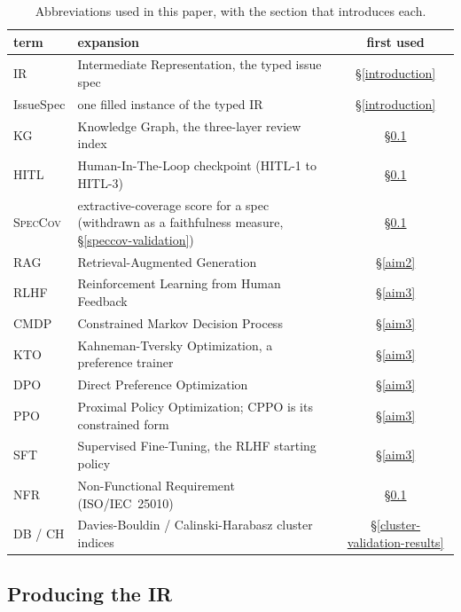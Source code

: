 \documentclass[sigconf, anonymous]{acmart}
\begin{document}
\begin{table}[t]\centering\footnotesize
\caption{Abbreviations used in this paper, with the section that introduces each.}\label{tab:acronyms}
\begin{tabular}{@{}llc@{}}\toprule
term & expansion & first used \\\midrule
IR & Intermediate Representation, the typed issue spec & \S\ref{introduction} \\
IssueSpec & one filled instance of the typed IR & \S\ref{introduction} \\
KG & Knowledge Graph, the three-layer review index & \S\ref{aim1} \\
HITL & Human-In-The-Loop checkpoint (HITL-1 to HITL-3) & \S\ref{aim1} \\
\textsc{SpecCov} & extractive-coverage score for a spec (withdrawn as a faithfulness measure, \S\ref{speccov-validation}) & \S\ref{aim1} \\
RAG & Retrieval-Augmented Generation & \S\ref{aim2} \\
RLHF & Reinforcement Learning from Human Feedback & \S\ref{aim3} \\
CMDP & Constrained Markov Decision Process & \S\ref{aim3} \\
KTO & Kahneman-Tversky Optimization, a preference trainer & \S\ref{aim3} \\
DPO & Direct Preference Optimization & \S\ref{aim3} \\
PPO & Proximal Policy Optimization; CPPO is its constrained form & \S\ref{aim3} \\
SFT & Supervised Fine-Tuning, the RLHF starting policy & \S\ref{aim3} \\
NFR & Non-Functional Requirement (ISO/IEC~25010) & \S\ref{aim1} \\
DB / CH & Davies-Bouldin / Calinski-Harabasz cluster indices & \S\ref{cluster-validation-results} \\
\bottomrule\end{tabular}\end{table}

\subsection{Producing the IR}\label{aim1}
\end{document}
